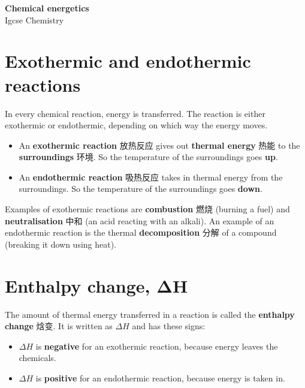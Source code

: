 \documentclass[11pt]{article}
\begin{document}
\begin{center}
  {\LARGE\bfseries Chemical energetics}\\[0.35em]
  {\large Igcse Chemistry}
\end{center}
\vspace{0.6em}

\section*{Exothermic and endothermic reactions}

In every chemical reaction, energy is transferred. The reaction is either exothermic or endothermic, depending on which way the energy moves.

\begin{itemize}
\item An \textbf{exothermic reaction} 放热反应 gives out \textbf{thermal energy} 热能 to the \textbf{surroundings} 环境. So the temperature of the surroundings goes \textbf{up}.

\item An \textbf{endothermic reaction} 吸热反应 takes in thermal energy from the surroundings. So the temperature of the surroundings goes \textbf{down}.

\end{itemize}

Examples of exothermic reactions are \textbf{combustion} 燃烧 (burning a fuel) and \textbf{neutralisation} 中和 (an acid reacting with an alkali). An example of an endothermic reaction is the thermal \textbf{decomposition} 分解 of a compound (breaking it down using heat).

\section*{Enthalpy change, ΔH}

The amount of thermal energy transferred in a reaction is called the \textbf{enthalpy change} 焓变. It is written as $\Delta H$ and has these signs:

\begin{itemize}
\item $\Delta H$ is \textbf{negative} for an exothermic reaction, because energy leaves the chemicals.

\item $\Delta H$ is \textbf{positive} for an endothermic reaction, because energy is taken in.

\end{itemize}
\end{document}
